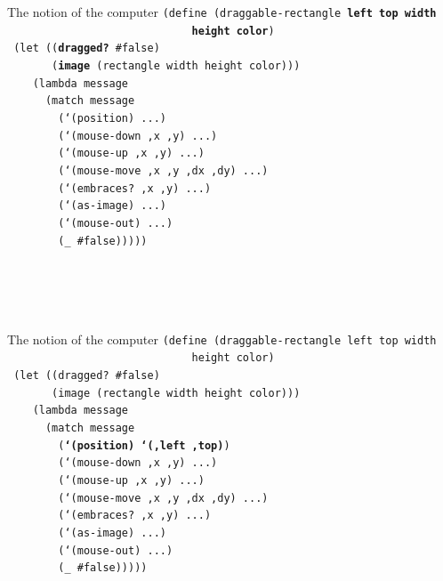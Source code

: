 \documentclass{beamer}
\begin{document}
\begin{frame}{The notion of the computer}
  \small
  \texttt{(define (draggable-rectangle \textbf{left top width \\
    \ \ \ \ \ \ \ \ \ \ \ \ \ \ \ \ \ \ \ \ \ \ \ \ \ \ \ \ \ height color})\\
    \ (let ((\textbf{dragged?} \#false)\\
  \ \ \ \ \ \ \ (\textbf{image} (rectangle width height color)))\\
  \ \ \ \ (lambda message\\
  \ \ \ \ \ \ (match message\\
  \ \ \ \ \ \ \ \ (`(position) ...)\\
  \ \ \ \ \ \ \ \ (`(mouse-down ,x ,y) ...)\\
  \ \ \ \ \ \ \ \ (`(mouse-up ,x ,y) ...)\\
  \ \ \ \ \ \ \ \ (`(mouse-move ,x ,y ,dx ,dy) ...)\\
  \ \ \ \ \ \ \ \ (`(embraces? ,x ,y) ...)\\
  \ \ \ \ \ \ \ \ (`(as-image) ...)\\
  \ \ \ \ \ \ \ \ (`(mouse-out) ...)\\
  \ \ \ \ \ \ \ \ (\_ \#false)))))\\
  \ \\
  \ \\
  \ \\
  \ 
}
\end{frame}

\begin{frame}{The notion of the computer}
  \small
  \texttt{(define (draggable-rectangle left top width \\
    \ \ \ \ \ \ \ \ \ \ \ \ \ \ \ \ \ \ \ \ \ \ \ \ \ \ \ \ \ height color)\\
    \ (let ((dragged? \#false)\\
  \ \ \ \ \ \ \ (image (rectangle width height color)))\\
  \ \ \ \ (lambda message\\
  \ \ \ \ \ \ (match message\\
  \ \ \ \ \ \ \ \ (\textbf{`(position) `(,left ,top)})\\
  \ \ \ \ \ \ \ \ (`(mouse-down ,x ,y) ...)\\
  \ \ \ \ \ \ \ \ (`(mouse-up ,x ,y) ...)\\
  \ \ \ \ \ \ \ \ (`(mouse-move ,x ,y ,dx ,dy) ...)\\
  \ \ \ \ \ \ \ \ (`(embraces? ,x ,y) ...)\\
  \ \ \ \ \ \ \ \ (`(as-image) ...)\\
  \ \ \ \ \ \ \ \ (`(mouse-out) ...)\\
  \ \ \ \ \ \ \ \ (\_ \#false)))))\\
  \ \\
  \ \\
  \ \\
  \ 
}
\end{frame}
\end{document}
